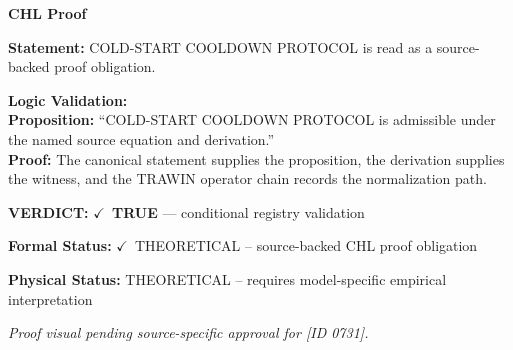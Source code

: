\vspace{0.45em}
\noindent\textbf{CHL Proof}\par
\textbf{Statement:} COLD-START COOLDOWN PROTOCOL is read as a source-backed proof obligation.

\textbf{Logic Validation:}\\
\textbf{Proposition:} ``COLD-START COOLDOWN PROTOCOL is admissible under the named source equation and derivation.''\\
\textbf{Proof:} The canonical statement supplies the proposition, the derivation supplies the witness, and the TRAWIN operator chain records the normalization path.

\textbf{VERDICT:} \ensuremath{\checkmark}\ \textbf{TRUE} --- conditional registry validation

\textbf{Formal Status:} \ensuremath{\checkmark}\ THEORETICAL -- source-backed CHL proof obligation

\textbf{Physical Status:} THEORETICAL -- requires model-specific empirical interpretation
\par\vspace{0.45em}
\par
\vfill
\begingroup\footnotesize\itshape
Proof visual pending source-specific approval for [ID 0731].
\par\endgroup
\vfill
\endgroup
\endgroup
